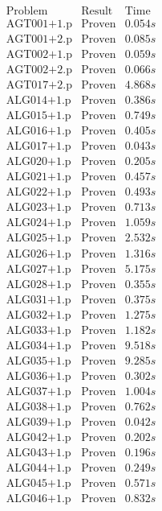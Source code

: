 \documentclass[a4paper,11pt]{report}
\theoremstyle{definition}
\theoremstyle{definition}
\theoremstyle{definition}
\theoremstyle{definition}
\theoremstyle{definition}
\theoremstyle{definition}
\theoremstyle{definition}
\begin{document}
	\begin{minipage}{0.45\textwidth}
		\[\begin{matrix}
			\text{Problem}&\text{Result}&\text{Time}\\
			\text{AGT001+1.p}&\text{Proven}& 0.054 s\\
			\text{AGT001+2.p}&\text{Proven}& 0.085 s\\
			\text{AGT002+1.p}&\text{Proven}& 0.059 s\\
			\text{AGT002+2.p}&\text{Proven}& 0.066 s\\
			\text{AGT017+2.p}&\text{Proven}& 4.868 s\\
			\text{ALG014+1.p}&\text{Proven}& 0.386 s\\
			\text{ALG015+1.p}&\text{Proven}& 0.749 s\\
			\text{ALG016+1.p}&\text{Proven}& 0.405 s\\
			\text{ALG017+1.p}&\text{Proven}& 0.043 s\\
			\text{ALG020+1.p}&\text{Proven}& 0.205 s\\
			\text{ALG021+1.p}&\text{Proven}& 0.457 s\\
			\text{ALG022+1.p}&\text{Proven}& 0.493 s\\
			\text{ALG023+1.p}&\text{Proven}& 0.713 s\\
			\text{ALG024+1.p}&\text{Proven}& 1.059 s\\
			\text{ALG025+1.p}&\text{Proven}& 2.532 s\\
			\text{ALG026+1.p}&\text{Proven}& 1.316 s\\
			\text{ALG027+1.p}&\text{Proven}& 5.175 s\\
			\text{ALG028+1.p}&\text{Proven}& 0.355 s\\
			\text{ALG031+1.p}&\text{Proven}& 0.375 s\\
			\text{ALG032+1.p}&\text{Proven}& 1.275 s\\
			\text{ALG033+1.p}&\text{Proven}& 1.182 s\\
			\text{ALG034+1.p}&\text{Proven}& 9.518 s\\
			\text{ALG035+1.p}&\text{Proven}& 9.285 s\\
			\text{ALG036+1.p}&\text{Proven}& 0.302 s\\
			\text{ALG037+1.p}&\text{Proven}& 1.004 s\\
			\text{ALG038+1.p}&\text{Proven}& 0.762 s\\
			\text{ALG039+1.p}&\text{Proven}& 0.042 s\\
			\text{ALG042+1.p}&\text{Proven}& 0.202 s\\
			\text{ALG043+1.p}&\text{Proven}& 0.196 s\\
			\text{ALG044+1.p}&\text{Proven}& 0.249 s\\
			\text{ALG045+1.p}&\text{Proven}& 0.571 s\\
			\text{ALG046+1.p}&\text{Proven}& 0.832 s\\
		\end{matrix}\]
	\end{minipage}
\end{document}
